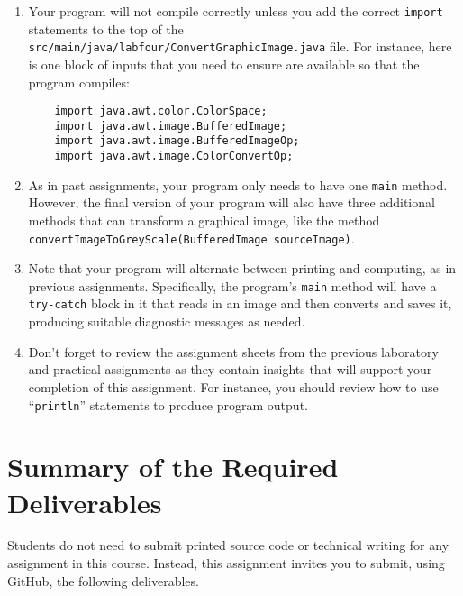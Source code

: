 \documentclass[11pt]{article}
\newcommand{\mainprogramsource}{\lstinline{src/main/java/labfour/ConvertGraphicImage.java}}
\newcommand{\command}[1]{``\lstinline{#1}''}
\newcommand{\program}[1]{\lstinline{#1}}
\begin{document}
\begin{enumerate}
  \setlength{\itemsep}{0pt}

\item Your program will not compile correctly unless you add the correct
  \program{import} statements to the top of the \mainprogramsource{} file. For
  instance, here is one block of inputs that you need to ensure are available so
  that the program compiles:

  \vspace*{-.1in}
  \begin{verbatim}
    import java.awt.color.ColorSpace;
    import java.awt.image.BufferedImage;
    import java.awt.image.BufferedImageOp;
    import java.awt.image.ColorConvertOp;
  \end{verbatim}
  \vspace*{-.25in}

\item As in past assignments, your program only needs to have one {\tt main}
  method. However, the final version of your program will also have three
  additional methods that can transform a graphical image, like the method
  \program{convertImageToGreyScale(BufferedImage sourceImage)}.

\item Note that your program will alternate between printing and computing, as
  in previous assignments. Specifically, the program's \program{main} method
  will have a \program{try-catch} block in it that reads in an image and then
  converts and saves it, producing suitable diagnostic messages as needed.

\item Don't forget to review the assignment sheets from the previous laboratory
  and practical assignments as they contain insights that will support your
  completion of this assignment. For instance, you should review how to use
  \command{println} statements to produce program output.

\end{enumerate}

\section*{Summary of the Required Deliverables}

\noindent Students do not need to submit printed source code or technical
writing for any assignment in this course. Instead, this assignment invites you
to submit, using GitHub, the following deliverables.
\end{document}
